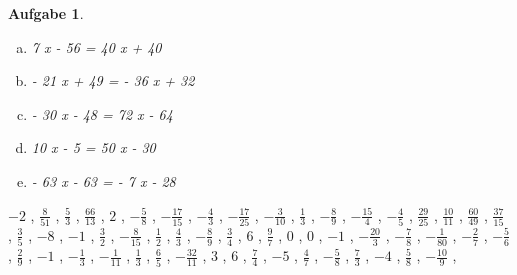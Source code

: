 \documentclass[12pt,fleqn]{article}
\theoremstyle{aufg}
\newtheorem{aufgabe}{Aufgabe}
\theoremstyle{bsp}
\begin{document}
\begin{flushleft}
\begin{aufgabe}
\begin{multicols}{3}
\begin{enumerate}[a)]
14 x - 63 = x + 3
\item 
7 x - 56 = 40 x + 40
\item 
- 21 x + 49 = - 36 x + 32
\item 
- 30 x - 48 = 72 x - 64
\item 
10 x - 5 = 50 x - 30
\item 
- 63 x - 63 = - 7 x - 28
\end{enumerate} 
\end{multicols} 
\end{aufgabe} 
$ \scriptstyle-2$ , $ \scriptstyle\frac{8}{51}$ , $ \scriptstyle\frac{5}{3}$ , $ \scriptstyle\frac{66}{13}$ , $ \scriptstyle2$ , $ \scriptstyle- \frac{5}{8}$ , $ \scriptstyle- \frac{17}{15}$ , $ \scriptstyle- \frac{4}{3}$ , $ \scriptstyle- \frac{17}{25}$ , $ \scriptstyle- \frac{3}{10}$ , $ \scriptstyle\frac{1}{3}$ , $ \scriptstyle- \frac{8}{9}$ , $ \scriptstyle- \frac{15}{4}$ , $ \scriptstyle- \frac{4}{5}$ , $ \scriptstyle\frac{29}{25}$ , $ \scriptstyle\frac{10}{11}$ , $ \scriptstyle\frac{60}{49}$ , $ \scriptstyle\frac{37}{15}$ , $ \scriptstyle\frac{3}{5}$ , $ \scriptstyle-8$ , $ \scriptstyle-1$ , $ \scriptstyle\frac{3}{2}$ , $ \scriptstyle- \frac{8}{15}$ , $ \scriptstyle\frac{1}{2}$ , $ \scriptstyle\frac{4}{3}$ , $ \scriptstyle- \frac{8}{9}$ , $ \scriptstyle\frac{3}{4}$ , $ \scriptstyle6$ , $ \scriptstyle\frac{9}{7}$ , $ \scriptstyle0$ , $ \scriptstyle0$ , $ \scriptstyle-1$ , $ \scriptstyle- \frac{20}{3}$ , $ \scriptstyle- \frac{7}{8}$ , $ \scriptstyle- \frac{1}{80}$ , $ \scriptstyle- \frac{2}{7}$ , $ \scriptstyle- \frac{5}{6}$ , $ \scriptstyle\frac{2}{9}$ , $ \scriptstyle-1$ , $ \scriptstyle- \frac{1}{3}$ , $ \scriptstyle- \frac{1}{11}$ , $ \scriptstyle\frac{1}{3}$ , $ \scriptstyle\frac{6}{5}$ , $ \scriptstyle- \frac{32}{11}$ , $ \scriptstyle3$ , $ \scriptstyle6$ , $ \scriptstyle\frac{7}{4}$ , $ \scriptstyle-5$ , $ \scriptstyle\frac{4}{7}$ , $ \scriptstyle- \frac{5}{8}$ , $ \scriptstyle\frac{7}{3}$ , $ \scriptstyle-4$ , $ \scriptstyle\frac{5}{8}$ , $ \scriptstyle- \frac{10}{9}$ , \\[0.2em] 

\end{flushleft}
\end{document}
